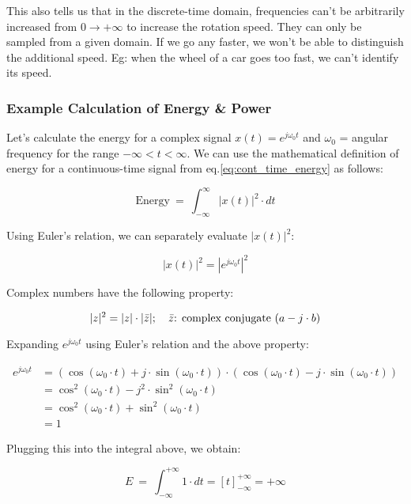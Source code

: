 \documentclass[letterpaper,12pt]{article}
\begin{document}
This also tells us that in the discrete-time domain, frequencies can't be arbitrarily increased from $0 \to +\infty$ to increase the rotation speed. They can only be sampled from a given domain. If we go any faster, we won't be able to distinguish the additional speed. Eg: when the wheel of a car goes too fast, we can't identify its speed.

\subsubsection*{Example Calculation of Energy \& Power}
Let's calculate the energy for a complex signal $x(t) = e^{j{\omega_0}t}$  and $\omega_0$ = angular frequency for the range $-\infty < t < \infty$. We can use the mathematical definition of energy for a continuous-time signal from eq.\ref{eq:cont_time_energy} as follows:

\[\text{Energy}\ =\ \int_{-\infty}^{\infty}\left|x\left(t\right)\right|^{2}\cdot dt\]

Using Euler's relation, we can separately evaluate $|x(t)|^2$:

\[|x(t)|^{2}=|e^{j\omega_{0}t}|^{2}\]

Complex numbers have the following property:

\[|z|^2=|z|\cdot|\Bar{z}|; \quad \Bar{z}\text{: complex conjugate } (a-j\cdot b)\]

Expanding $e^{j\omega_{0}t}$ using Euler's relation and the above property:

\begin{equation*}
    \begin{aligned}
        e^{j\omega_{0}t} & = (\cos(\omega_0 \cdot t) + j\cdot \sin(\omega_0 \cdot t)) \cdot (\cos(\omega_0 \cdot t) - j\cdot \sin(\omega_0 \cdot t)) \\
                         & = \cos^2(\omega_0 \cdot t) - j^2\cdot \sin^2(\omega_0 \cdot t)                                                            \\
                         & = \cos^2(\omega_0 \cdot t) + \sin^2(\omega_0 \cdot t)                                                                     \\
                         & = 1
    \end{aligned}
\end{equation*}

Plugging this into the integral above, we obtain:

\[E\ =\ \int_{-\infty}^{+\infty}1\cdot dt=\left[t\right]_{-\infty}^{+\infty}=+\infty\]
\end{document}
